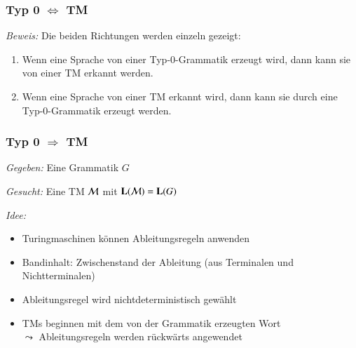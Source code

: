 \documentclass[aspectratio=1610,onlymath]{beamer}
\begin{document}
\begin{frame}\frametitle{Typ 0 $\Leftrightarrow$ TM}

\medskip

\emph{Beweis:} Die beiden Richtungen werden einzeln gezeigt:
\begin{enumerate}[(1)]
\item Wenn eine Sprache von einer Typ-0-Grammatik erzeugt wird, dann kann sie von einer TM erkannt werden.
\item Wenn eine Sprache von einer TM erkannt wird, dann kann sie durch eine Typ-0-Grammatik erzeugt werden.
\end{enumerate}

\end{frame}

\begin{frame}\frametitle{Typ 0 $\Rightarrow$ TM}

\emph{Gegeben:} Eine Grammatik $G$
\medskip

\emph{Gesucht:} Eine TM $\mathcal{M}$ mit $\textbf{\textcolor{black}{L}}(\mathcal{M})=\textbf{\textcolor{black}{L}}(G)$
\medskip\pause

\emph{Idee:}
\begin{itemize}
\item Turingmaschinen können Ableitungsregeln anwenden
\item Bandinhalt: Zwischenstand der Ableitung (aus Terminalen und Nichtterminalen)
\item Ableitungsregel wird nichtdeterministisch gewählt
\item TMs beginnen mit dem von der Grammatik erzeugten Wort\\$\leadsto$ Ableitungsregeln werden rückwärts angewendet
\end{itemize}

\end{frame}
\end{document}
